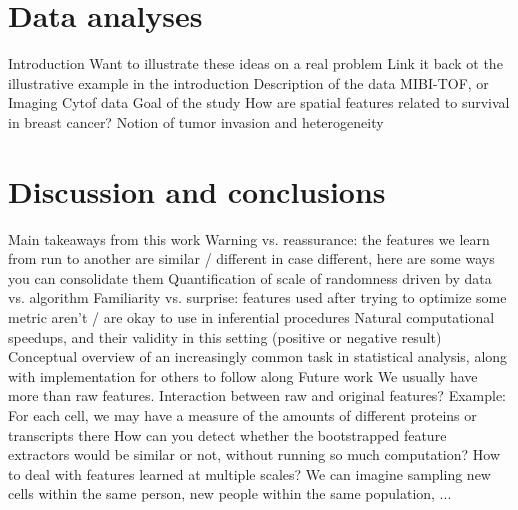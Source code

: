 \documentclass[11pt]{article}
\begin{document}
\section{Data analyses}

\begin{outline}
  \1 Introduction
    \2 Want to illustrate these ideas on a real problem
      \3 Link it back ot the illustrative example in the introduction
    \2 Description of the data
      \3 MIBI-TOF, or Imaging Cytof data
  \1 Goal of the study
    \2 How are spatial features related to survival in breast cancer?
    \2 Notion of tumor invasion and heterogeneity
\end{outline}

\section{Discussion and conclusions}

\begin{outline}
  \1 Main takeaways from this work
    \2 Warning vs. reassurance: the features we learn from run to another are
    similar / different
      \3 in case different, here are some ways you can consolidate them
      \3 Quantification of scale of randomness driven by data vs. algorithm
    \2 Familiarity vs. surprise: features used after trying to optimize some
    metric aren't / are okay to use in inferential procedures
    \2 Natural computational speedups, and their validity in this setting
    (positive or negative result)
    \2 Conceptual overview of an increasingly common task in statistical
    analysis, along with implementation for others to follow along
  \1 Future work
    \2 We usually have more than raw features. Interaction between raw and
    original features?
      \3 Example: For each cell, we may have a measure of the amounts of
      different proteins or transcripts there
    \2 How can you detect whether the bootstrapped feature extractors would be
    similar or not, without running so much computation?
    \2 How to deal with features learned at multiple scales? We can imagine
    sampling new cells within the same person, new people within the same
    population, ...
\end{outline}



\end{document}
